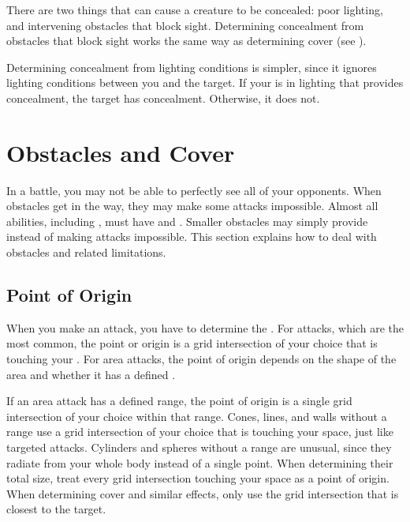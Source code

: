          There are two things that can cause a creature to be concealed: poor lighting, and intervening obstacles that block sight.
        Determining concealment from obstacles that block sight works the same way as determining cover (see ).

        Determining concealment from lighting conditions is simpler, since it ignores lighting conditions between you and the target.
        If your  is in lighting that provides concealment, the target has concealment.
        Otherwise, it does not.

\section{Obstacles and Cover}\label{Obstacles and Cover}
    In a battle, you may not be able to perfectly see all of your opponents.
    When obstacles get in the way, they may make some attacks impossible.
    Almost all abilities, including , must have  and .
    Smaller obstacles may simply provide  instead of making attacks impossible.
    This section explains how to deal with obstacles and related limitations.

    \subsection{Point of Origin}\label{Point of Origin}
        When you make an attack, you have to determine the .
        For  attacks, which are the most common, the point or origin is a grid intersection of your choice that is touching your .
        For area attacks, the point of origin depends on the shape of the area and whether it has a defined .

        If an area attack has a defined range, the point of origin is a single grid intersection of your choice within that range.
        Cones, lines, and walls without a range use a grid intersection of your choice that is touching your space, just like targeted attacks.
        Cylinders and spheres without a range are unusual, since they radiate from your whole body instead of a single point.
        When determining their total size, treat every grid intersection touching your space as a point of origin.
        When determining cover and similar effects, only use the grid intersection that is closest to the target.

